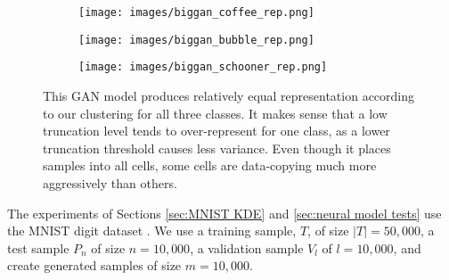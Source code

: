 \begin{figure*}[h]
    \centering
    \begin{subfigure}{.31\linewidth}
        \centering
        \texttt{[image: images/biggan\_coffee\_rep.png]}
        \caption{}\label{fig:moons KDE rep}
    \end{subfigure}
        \hfill
    \begin{subfigure}{.31\linewidth}
        \centering
        \texttt{[image: images/biggan\_bubble\_rep.png]}
        \caption{}\label{fig:mnist kde rep}
    \end{subfigure}
        \hfill
    \begin{subfigure}{.31\linewidth}
        \centering
        \texttt{[image: images/biggan\_schooner\_rep.png]}
        \caption{}\label{fig:vae rep}
    \end{subfigure}
    \caption[This GAN model produces relatively equal representation according to our clustering for all three classes.]{This GAN model produces relatively equal representation according to our clustering for all three classes. It makes sense that a low truncation level tends to over-represent for one class, as a lower truncation threshold causes less variance. Even though it places samples into all cells, some cells are data-copying much more aggressively than others.}
    \label{fig:biggan rep tests }
\end{figure*} 
The experiments of Sections \ref{sec:MNIST KDE} and \ref{sec:neural model tests} use the MNIST digit dataset \citep{lecun}. We use a training sample, $T$, of size $|T| = 50,000$, a test sample $P_n$ of size $n = 10,000$, a validation sample $V_l$ of $l = 10,000$, and create generated samples of size $m = 10,000$. 

